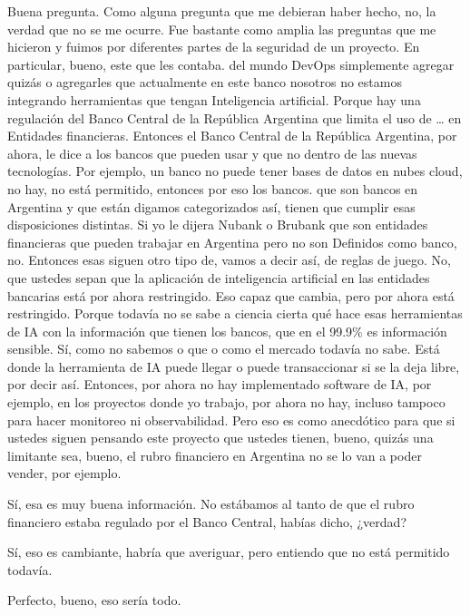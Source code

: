 \begin{description}[leftmargin=0cm, labelsep=0.5cm]
    \item[\textbf{VILLARINO PABLO RODOLFO:}] Buena pregunta. Como alguna pregunta que me debieran haber hecho, no, la verdad que no se me ocurre. Fue bastante como amplia las preguntas que me hicieron y fuimos por diferentes partes de la seguridad de un proyecto. En particular, bueno, este que les contaba. del mundo DevOps simplemente agregar quizás o agregarles que actualmente en este banco nosotros no estamos integrando herramientas que tengan Inteligencia artificial. Porque hay una regulación del Banco Central de la República Argentina que limita el uso de … en Entidades financieras. Entonces el Banco Central de la República Argentina, por ahora, le dice a los bancos que pueden usar y que no dentro de las nuevas tecnologías. Por ejemplo, un banco no puede tener bases de datos en nubes cloud, no hay, no está permitido, entonces por eso los bancos. que son bancos en Argentina y que están digamos categorizados así, tienen que cumplir esas disposiciones distintas. Si yo le dijera Nubank o Brubank que son entidades financieras que pueden trabajar en Argentina pero no son Definidos como banco, no. Entonces esas siguen otro tipo de, vamos a decir así, de reglas de juego. No, que ustedes sepan que la aplicación de inteligencia artificial en las entidades bancarias está por ahora restringido. Eso capaz que cambia, pero por ahora está restringido. Porque todavía no se sabe a ciencia cierta qué hace esas herramientas de IA con la información que tienen los bancos, que en el 99.9\% es información sensible. Sí, como no sabemos o que o como el mercado todavía no sabe. Está donde la herramienta de IA puede llegar o puede transaccionar si se la deja libre, por decir así. Entonces, por ahora no hay implementado software de IA, por ejemplo, en los proyectos donde yo trabajo, por ahora no hay, incluso tampoco para hacer monitoreo ni observabilidad. Pero eso es como anecdótico para que si ustedes siguen pensando este proyecto que ustedes tienen, bueno, quizás una limitante sea, bueno, el rubro financiero en Argentina no se lo van a poder vender, por ejemplo.

    \item[\textbf{MUNTAABSKI FEDERICO:}] Sí, esa es muy buena información. No estábamos al tanto de que el rubro financiero estaba regulado por el Banco Central, habías dicho, ¿verdad?

    \item[\textbf{VILLARINO PABLO RODOLFO:}] Sí, eso es cambiante, habría que averiguar, pero entiendo que no está permitido todavía.

    \item[\textbf{MUNTAABSKI FEDERICO:}] Perfecto, bueno, eso sería todo.
\end{description}
